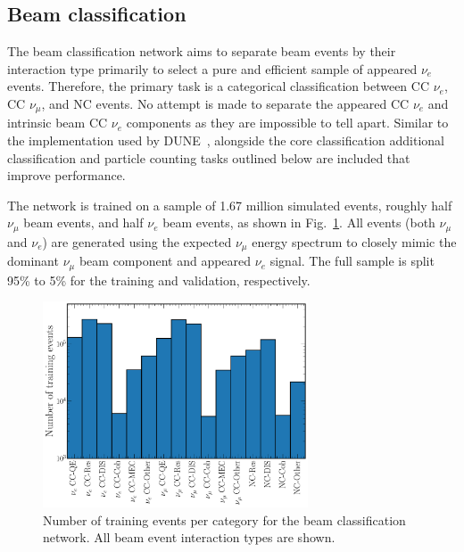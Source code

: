 \subsection{Beam classification}%
\label{sec:cvn_specific_beam} %

The beam classification network aims to separate beam events by their interaction type primarily
to select a pure and efficient sample of appeared $\nu_{e}$ events. Therefore, the primary task is
a categorical classification between CC $\nu_{e}$, CC $\nu_{\mu}$, and NC events. No attempt is
made to separate the appeared CC $\nu_{e}$ and intrinsic beam CC $\nu_{e}$ components as they are
impossible to tell apart. Similar to the implementation used by DUNE~\cite{collaboration2020},
alongside the core classification additional classification and particle counting tasks outlined
below are included that improve performance.

The network is trained on a sample of 1.67 million simulated events, roughly half $\nu_{\mu}$ beam
events, and half $\nu_{e}$ beam events, as shown in Fig.~\ref{fig:beam_training_sample}. All
events (both $\nu_{\mu}$ and $\nu_{e}$) are generated using the expected \chips $\nu_{\mu}$ energy
spectrum to closely mimic the dominant $\nu_{\mu}$ beam component and appeared $\nu_{e}$ signal.
The full sample is split 95\% to 5\% for the training and validation, respectively.

\begin{figure} %
    \includegraphics[width=0.7\textwidth]{diagrams/6-cvn/chipsnet/explore_beam_training_sample.pdf}
    \caption[Number of training events per category for the beam classification network.]
    {Number of training events per category for the beam classification network. All beam event
        interaction types are shown.}
    \label{fig:beam_training_sample}
\end{figure}

